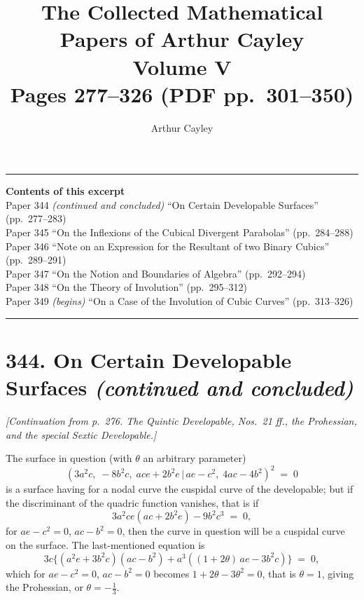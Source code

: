 \documentclass[11pt,a4paper]{article}
\title{\textbf{The Collected Mathematical Papers of Arthur Cayley}\\[6pt]
\Large Volume V\\[12pt]
\large Pages 277--326 \;(PDF pp.\ 301--350)}
\author{Arthur Cayley}
\date{}
\providecommand{\mid}{\,|\,}
\begin{document}
\maketitle
\thispagestyle{empty}

\vspace{1em}
\noindent\rule{\textwidth}{0.4pt}
\vspace{1em}

\begin{center}
\textbf{Contents of this excerpt}\\[4pt]
Paper 344 \textit{(continued and concluded)} ``On Certain Developable Surfaces'' (pp.~277--283)\\
Paper 345 ``On the Inflexions of the Cubical Divergent Parabolas'' (pp.~284--288)\\
Paper 346 ``Note on an Expression for the Resultant of two Binary Cubics'' (pp.~289--291)\\
Paper 347 ``On the Notion and Boundaries of Algebra'' (pp.~292--294)\\
Paper 348 ``On the Theory of Involution'' (pp.~295--312)\\
Paper 349 \textit{(begins)} ``On a Case of the Involution of Cubic Curves'' (pp.~313--326)
\end{center}

\noindent\rule{\textwidth}{0.4pt}
\vspace{1em}

\section*{344. On Certain Developable Surfaces \textit{(continued and concluded)}}

\noindent\textit{[Continuation from p.~276. The Quintic Developable, Nos.~21 ff., the Prohessian, and the special Sextic Developable.]}

\medskip

\noindent The surface in question (with $\theta$ an arbitrary parameter)
\[
(3a^2c,\;-8b^2c,\;ace+2b^2e\mid ae-c^2,\;4ac-4b^2)^2 \;=\; 0
\]
is a surface having for a nodal curve the cuspidal curve of the developable; but if the discriminant of the quadric function vanishes, that is if
\[
3a^2ce(ac+2b^2e) - 9b^2c^3 \;=\; 0,
\]
for $ae - c^2 = 0$, $ac - b^2 = 0$, then the curve in question will be a cuspidal curve on the surface. The last-mentioned equation is
\[
3c\bigl\{(a^2e + 3b^2c)(ac - b^2) + a^3((1+2\theta)\,ae - 3b^2c)\bigr\} \;=\; 0,
\]
which for $ae - c^2 = 0$, $ac - b^2 = 0$ becomes $1 + 2\theta - 3\theta^2 = 0$, that is $\theta = 1$, giving the Prohessian, or $\theta = -\tfrac{1}{3}$.
\end{document}
